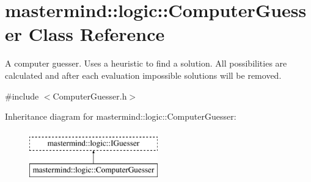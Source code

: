 \hypertarget{classmastermind_1_1logic_1_1_computer_guesser}{}\section{mastermind\+:\+:logic\+:\+:Computer\+Guesser Class Reference}
\label{classmastermind_1_1logic_1_1_computer_guesser}


A computer guesser. Uses a heuristic to find a solution. All possibilities are calculated and after each evaluation impossible solutions will be removed.  




{\ttfamily \#include $<$Computer\+Guesser.\+h$>$}

Inheritance diagram for mastermind\+:\+:logic\+:\+:Computer\+Guesser\+:\begin{figure}[H]
\begin{center}
\leavevmode
\includegraphics[height=2.000000cm]{classmastermind_1_1logic_1_1_computer_guesser}
\end{center}
\end{figure}
